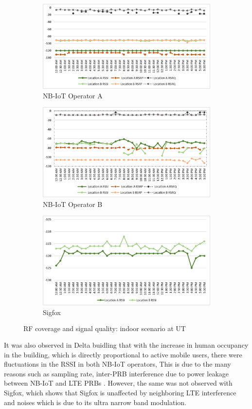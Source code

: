 \documentclass[12pt]{article}
\begin{document}
 \begin{figure}[h!]
\begin{subfigure}[t]{\linewidth}
  \centering
  \includegraphics[width=.5\linewidth]{Images/tartu/ATartuIndoor.pdf}  
  \caption{NB-IoT Operator A}
\end{subfigure}
\begin{subfigure}[t]{\linewidth}
  \centering
  \includegraphics[width=.5\linewidth]{Images/tartu/BTartuIndoor.pdf}  
  \caption{NB-IoT Operator B}
  
\end{subfigure}
\begin{subfigure}[t]{\linewidth}
  \centering
  \includegraphics[width=.5\linewidth]{Images/tartu/STartuIndoor.pdf}  
\caption{Sigfox}
 \end{subfigure}
\caption{RF coverage and signal quality: indoor scenario at UT}
 \label{RFIndoor Tartu}
\end{figure}

It was also observed in Delta buidling that with the increase in human occupancy in the building, which is directly proportional to active mobile users, there were fluctuations in the RSSI in both NB-IoT operators, This is due to the many reasons such as sampling rate, inter-PRB interference due to power leakage between NB-IoT and LTE PRBs \cite{mwakwata2019narrowband}. However, the same was not observed with Sigfox, which shows that Sigfox is unaffected by neighboring LTE interference and noises which is due to its ultra narrow band modulation.
\end{document}
